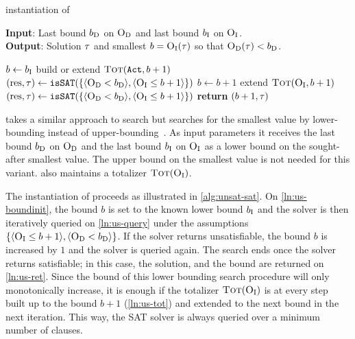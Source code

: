 \begin{algorithm}[t]
  \caption{\unsatsat{} instantiation of \Min{}}\label{alg:unsat-sat}
  \textbf{Input}: Last bound $b_{\text{D}}$ on $\textsc{O}_{\text{D}}$ and last bound $b_{\text{I}}$ on $\textsc{O}_{\text{I}}$. \\
  \textbf{Output}: Solution $\tau$ and smallest $b=\textsc{O}_{\text{I}}(\tau)$ so that $\textsc{O}_{\text{D}}(\tau)<b_{\text{D}}$.

  \begin{algorithmic}[1]
    \STATE $b \gets b_{\text{I}}$ \label{ln:us-boundinit}
    \STATE build or extend $\textsc{Tot}(\texttt{Act},b+1)$
    \STATE $(\text{res},\tau) \gets \texttt{isSAT}(\{\langle \textsc{O}_{\text{D}} < b_{\text{D}} \rangle, \langle \textsc{O}_{\text{I}} \leq b+1 \rangle\})$
    \WHILE{$\res = \unsat$}
      \STATE $b \gets b+1$
      \STATE extend $\textsc{Tot}(\textsc{O}_{\text{I}},b+1)$ \label{ln:us-tot}
      \STATE $(\text{res},\tau) \gets \texttt{isSAT}(\{\langle \textsc{O}_{\text{D}} < b_{\text{D}} \rangle, \langle \textsc{O}_{\text{I}} \leq b+1 \rangle\})$ \label{ln:us-query}
    \ENDWHILE
    \STATE \textbf{return} $(b+1,\tau)$ \label{ln:us-ret}
  \end{algorithmic}
\end{algorithm}

\unsatsat{} takes a similar approach to \satunsat{} search but searches for the smallest value by lower-bounding instead of upper-bounding~\autocite{DBLP:conf/sat/FuM06}.
As input parameters it receives the last bound $b_{\text{D}}$ on $\textsc{O}_{\text{D}}$ and the last bound $b_{\text{I}}$ on $\textsc{O}_{\text{I}}$ as a lower bound on the sought-after smallest value.
The upper bound on the smallest value is not needed for this variant.
\unsatsat{} also maintains a totalizer $\textsc{Tot}(\textsc{O}_{\text{I}})$.

The \unsatsat{} instantiation of \Min{} proceeds as illustrated in \cref{alg:unsat-sat}.
On \cref{ln:us-boundinit}, the bound $b$ is set to the known lower bound $b_{\text{I}}$ and the solver is then iteratively queried on \cref{ln:us-query} under the assumptions $\{ \langle \textsc{O}_{\text{I}} \leq b+1 \rangle, \langle \textsc{O}_{\text{D}} < b_{\text{D}} \rangle \}$.
If the solver returns unsatisfiable, the bound $b$ is increased by $1$ and the solver is queried again.
The search ends once the solver returns satisfiable;
in this case, the solution, and the bound are returned on \cref{ln:us-ret}.
Since the bound of this lower bounding search procedure will only monotonically increase, it is enough if the totalizer $\textsc{Tot}(\textsc{O}_{\text{I}})$ is at every step built up to the bound $b+1$ (\cref{ln:us-tot}) and extended to the next bound in the next iteration.
This way, the SAT solver is always queried over a minimum number of clauses.

